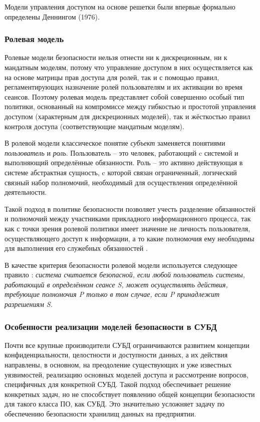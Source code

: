 Модели управления доступом на основе решетки были впервые формально определены Деннингом (1976).

\subsubsection{Ролевая модель}

Ролевые модели безопасности нельзя отнести ни к дискреционным, ни к мандатным моделям, потому что 
управление доступом в них осуществляется как на основе матрицы прав доступа для ролей, так и с помощью 
правил, регламентирующих назначение ролей пользователям и их активации во время сеансов. Поэтому 
ролевая модель представляет собой совершенно особый тип политики, основанный на компромиссе между 
гибкостью и простотой управления доступом (характерным для дискреционных моделей), так и жёсткостью 
правил контроля доступа (соответствующие мандатным моделям).

В ролевой модели классическое понятие \textit{субъект} заменяется понятиями \textit{пользователь} и 
\textit{роль}. Пользователь -- это человек, работающий c системой и выполняющий определённые 
обязанности. Роль -- это активно действующая в системе абстрактная сущность, c которой связан 
ограниченный, логический связный набор полномочий, необходимый для осуществления определённой деятельности.

Такой подход в политике безопасности позволяет учесть разделение обязанностей и полномочий между 
участниками прикладного информационного процесса, так как с точки зрения ролевой политики имеет 
значение не личность пользователя, осуществляющего доступ к информации, а то какие полномочия ему 
необходимы для выполнения его служебных обязанностей \autocite{Zegzhda}. 

В качестве критерия безопасности ролевой модели используется следующее правило \autocite{Zegzhda}: 
\textit{система считается безопасной, если любой пользователь системы, работающий в определённом 
сеансе S, может осуществлять действия, требующие полномочия P только в том случае, если P принадлежит 
разрешениям S.}

\subsubsection{Особенности реализации моделей безопасности в СУБД}

Почти все крупные производители СУБД ограничиваются развитием концепции конфиденциальности, целостности 
и доступности данных, а их действия направлены, в основном, на преодоление существующих и уже известных 
уязвимостей, реализацию основных моделей доступа и рассмотрение вопросов, специфичных для конкретной СУБД. 
Такой подход обеспечивает решение конкретных задач, но не способствует появлению общей концепции 
безопасности для такого класса ПО, как СУБД. Это значительно усложняет задачу по обеспечению безопасности 
хранилищ данных на предприятии.

